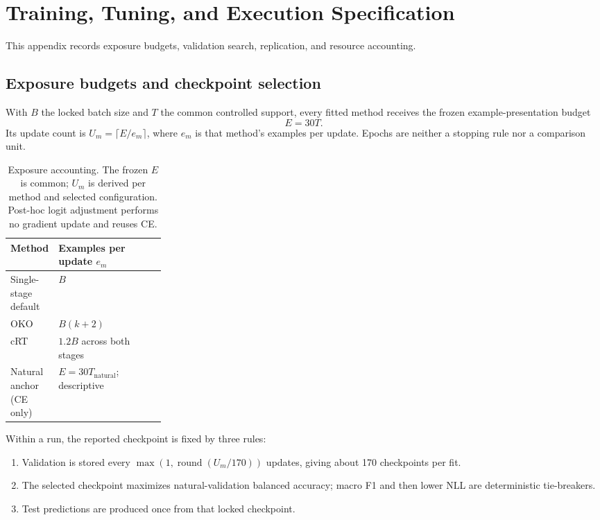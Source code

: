 \documentclass[11pt]{article}
\begin{document}
\section{Training, Tuning, and Execution Specification}
\label{app:training}
This appendix records exposure budgets, validation search, replication, and resource accounting.

\subsection{Exposure budgets and checkpoint selection}
With $B$ the locked batch size and $T$ the common controlled support, every fitted method receives the frozen example-presentation budget
\begin{equation}
  E=30T.
  \label{eq:example-budget}
\end{equation}
\noindent Its update count is $U_m=\lceil E/e_m\rceil$, where $e_m$ is that method's examples per update. Epochs are neither a stopping rule nor a comparison unit.

\begin{table}[ht]
  \centering
  \footnotesize
  \begin{tabularx}{\linewidth}{@{}>{\raggedright\arraybackslash}p{0.26\linewidth}X@{}}
    \toprule
    Method & Examples per update $e_m$ \\
    \midrule
    Single-stage default & $B$ \\
    OKO & $B(k+2)$ \\
    cRT & $1.2B$ across both stages \\
    Natural anchor (CE only) & $E=30T_{\mathrm{natural}}$; descriptive \\
    \bottomrule
  \end{tabularx}
  \caption{Exposure accounting. The frozen $E$ is common; $U_m$ is derived per method and selected configuration. Post-hoc logit adjustment performs no gradient update and reuses CE.}
  \label{tab:budgets}
\end{table}

\noindent Within a run, the reported checkpoint is fixed by three rules:
\begin{enumerate}
  \item Validation is stored every $\max(1,\operatorname{round}(U_m/170))$ updates, giving about 170 checkpoints per fit.
  \item The selected checkpoint maximizes natural-validation balanced accuracy; macro F1 and then lower NLL are deterministic tie-breakers.
  \item Test predictions are produced once from that locked checkpoint.
\end{enumerate}
\end{document}
